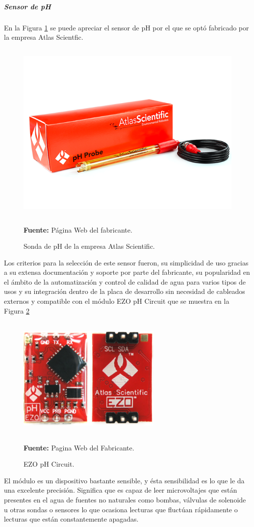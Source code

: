 \subparagraph{Sensor de pH}
En la Figura \ref{fig:4.8} se puede apreciar el sensor de pH por el que se optó fabricado por la empresa Atlas Scientfic.
\begin{figure}[ht]
    \centering
	\includegraphics[width=150mm, height=90mm]{Imagenes/2021/imag23.png}%
	\caption[Sonda de pH de la empresa Atlas Scientific]{Sonda de pH de la empresa Atlas Scientific. }{\textbf{Fuente:} Página Web del fabricante.}
	\label{fig:4.8}
\end{figure}
Los criterios para la selección de este sensor fueron, su simplicidad de uso gracias a su extensa documentación y soporte por parte del fabricante, su popularidad en el ámbito de la automatización y control de calidad de agua para varios tipos de usos y su integración dentro de la placa de desarrollo sin necesidad de cableados externos y compatible con el módulo EZO pH Circuit que se muestra en la Figura \ref{fig:4.9}
\newline
\hfill
    \begin{figure}[ht]
    \centering
	\includegraphics[width=70mm, height=60mm]{Imagenes/2021/imag27.png}%
	\caption[EZO pH Circuit]{EZO pH Circuit.}{\textbf{Fuente:} Pagina Web del Fabricante.}
	\label{fig:4.9}
    \end{figure}
El módulo es un dispositivo bastante sensible, y ésta sensibilidad es lo que le da una excelente precisión. Significa que es capaz de leer microvoltajes que están presentes en el agua de fuentes no naturales como bombas, válvulas de solenoide u otras sondas o sensores lo que ocasiona lecturas que fluctúan rápidamente o lecturas que están constantemente apagadas.

